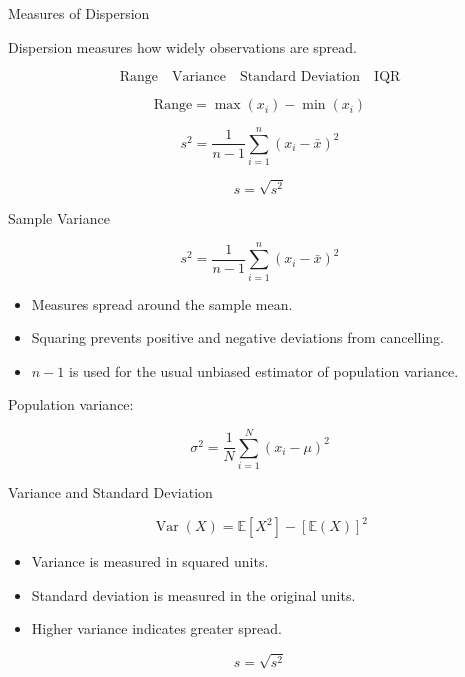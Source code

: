 \documentclass[aspectratio=169,11pt]{beamer}
\newcommand{\E}{\mathbb{E}}
\newcommand{\Var}{\operatorname{Var}}
\begin{document}
\begin{frame}{Measures of Dispersion}

Dispersion measures how widely observations are spread.

\begin{center}
\[
\boxed{
\text{Range}\quad
\text{Variance}\quad
\text{Standard Deviation}\quad
\text{IQR}
}
\]
\end{center}

\[
\text{Range}=\max(x_i)-\min(x_i)
\]

\[
s^2=
\frac{1}{n-1}
\sum_{i=1}^{n}(x_i-\bar{x})^2
\]

\[
s=\sqrt{s^2}
\]

\end{frame}

\begin{frame}{Sample Variance}

\[
\boxed{
s^2=
\frac{1}{n-1}
\sum_{i=1}^{n}(x_i-\bar{x})^2
}
\]

\begin{itemize}
    \item Measures spread around the sample mean.
    \item Squaring prevents positive and negative deviations from cancelling.
    \item $n-1$ is used for the usual unbiased estimator of population variance.
\end{itemize}

Population variance:

\[
\sigma^2=
\frac{1}{N}
\sum_{i=1}^{N}(x_i-\mu)^2
\]

\end{frame}

\begin{frame}{Variance and Standard Deviation}

\[
\Var(X)=\E[X^2]-[\E(X)]^2
\]

\begin{itemize}
    \item Variance is measured in squared units.
    \item Standard deviation is measured in the original units.
    \item Higher variance indicates greater spread.
\end{itemize}

\[
\boxed{s=\sqrt{s^2}}
\]

\end{frame}
\end{document}
